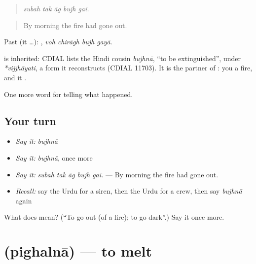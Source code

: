 \begin{quote}
    
\end{quote}

\begin{quote}
\emph{subah tak āg bujh gaī.}
\end{quote}

\begin{quote}
By morning the fire had gone out.
\end{quote}

Past (it …):    , \emph{voh chirāgh bujh gayā}.

\begin{cousinweb}
is inherited: CDIAL lists the Hindi cousin \emph{bujhnā}, \textquotedblleft{}to be extinguished\textquotedblright{}, under \emph{*vijjhāyati}, a form it reconstructs (CDIAL 11703). It is the partner of \textbf{}: you \textbf{} a fire, and it \textbf{}.
\end{cousinweb}

\begin{grammarlens}[title={What you've built}]
One more word for telling what happened.
\end{grammarlens}

\subsection*{Your turn}
\begin{itemize}
\raggedright
  \item \emph{Say it:} \emph{bujhnā}
  \item \emph{Say it:} \emph{bujhnā}, once more
  \item \emph{Say it:} \emph{subah tak āg bujh gaī.} — By morning the fire had gone out.
  \item \emph{Recall:} say the Urdu for a siren, then the Urdu for a crew, then say \emph{bujhnā} again
\end{itemize}

\begin{tcolorbox}[breakable,colback=teal!4,colframe=teal!35!black,title={Before you move on}]
What does  mean? (\textquotedblleft{}To go out (of a fire); to go dark\textquotedblright{}.) Say it once more.
\end{tcolorbox}
\section[\texorpdfstring{\ur{پگھلنا} (pighalnā)}{پگھلنا (pighalnā)}]{ (pighalnā) — to melt}

